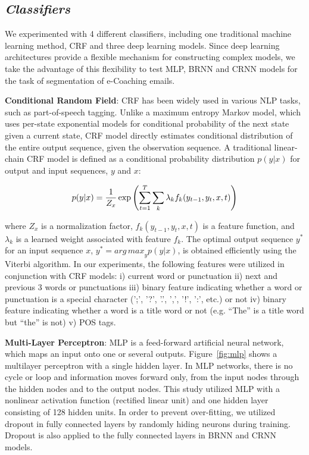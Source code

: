 \documentclass{amia}
\begin{document}
\subsection*{\textit{Classifiers}}

We experimented with 4 different classifiers, including one traditional machine learning method, CRF and three deep learning models. Since deep learning architectures provide a flexible mechanism for constructing complex models, we take the advantage of this flexibility to test MLP, BRNN and CRNN models for the task of segmentation of e-Coaching emails.

\textbf{Conditional Random Field}: CRF has been widely used in various NLP tasks, such as part-of-speech tagging.\cite{lafferty2001conditional, hirohata2008identifying} Unlike a maximum entropy Markov model, which uses per-state exponential models for conditional probability of the next state given a current state, CRF model directly estimates conditional distribution of the entire output sequence, given the observation sequence. A traditional linear-chain CRF model is defined as a conditional probability distribution $p(y|x)$ for output and input sequences, $y$ and $x$:

\begin{equation}
\label{Eq:crf}
p(y|x) = \frac{1}{Z_x}\exp{\left(\sum_{t=1}^{T}\sum_{k}^{}\lambda_k f_k(y_{t-1}, y_t, x, t)\right)} \\
\end{equation}

where $Z_x$ is a normalization factor, $f_k(y_{t-1}, y_t, x, t)$ is a feature function, and $\lambda_k$ is a learned weight associated with feature $f_k$. The optimal output sequence $y^*$ for an input sequence $x$, $y^* = {arg\,max}_y p(y|x)$, is obtained efficiently using the Viterbi algorithm. In our experiments, the following features were utilized in conjunction with CRF models: i) current word or punctuation ii) next and previous 3 words or punctuations iii) binary feature indicating whether a word or punctuation is a special character (';', '?', '.', ',', '!', ':', etc.) or not iv) binary feature indicating whether a word is a title word or not (e.g. ``The'' is a title word but ``the'' is not) v) POS tags.   

\textbf{Multi-Layer Perceptron}: MLP is a feed-forward artificial neural network, which maps an input onto one or several outputs.\cite{rumelhart1986learning} Figure~\ref{fig:mlp} shows a multilayer perceptron with a single hidden layer. In MLP networks, there is no cycle or loop and information moves forward only, from the input nodes through the hidden nodes and to the output nodes. This study utilized MLP with a nonlinear activation function (rectified linear unit) and one hidden layer consisting of 128 hidden units. In order to prevent over-fitting, we utilized dropout in fully connected layers by randomly hiding neurons during training. \cite{srivastava2014dropout} Dropout is also applied to the fully connected layers in BRNN and CRNN models. 
\end{document}
